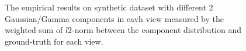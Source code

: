 \documentclass[11pt]{article}
\begin{document}
\begin{figure}
\caption{The empirical results on synthetic dataset with different 2 Gaussian/Gamma components in eavh view measured by the weighted sum of $l2$-norm between the component distribution and ground-truth for each view.}
\end{figure}
\end{document}
